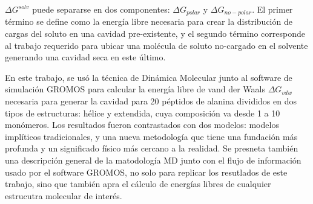 $\Delta G^{solv}$ puede separarse en dos componentes: $\Delta G_{polar}$ y $\Delta G_{no-polar}$. El primer término se define como la energía libre necesaria para crear la distribución de cargas del soluto en una cavidad pre-existente, y el segundo término corresponde al trabajo requerido para ubicar una molécula de soluto no-cargado en el solvente generando una cavidad seca en este último. 

En este trabajo, se usó la técnica de Dinámica Molecular junto al software de simulación GROMOS para calcular la energía libre de vand der Waals $\Delta G_{vdw}$ necesaria para generar la cavidad para 20 péptidos de alanina divididos en dos tipos de estructuras: hélice y extendida, cuya composición va desde 1 a 10 monómeros. Los resultados fueron contrastados con dos modelos: modelos implíticos tradicionales, y una nueva metodología que tiene una fundación más profunda y un significado físico más cercano a la realidad.
Se presneta también una descripción general de la matodología MD junto con el flujo de información usado por el software GROMOS, no solo para replicar los resutlados de este trabajo, sino que también apra el cálculo de energías libres de cualquier estrucutra molecular de interés. 







